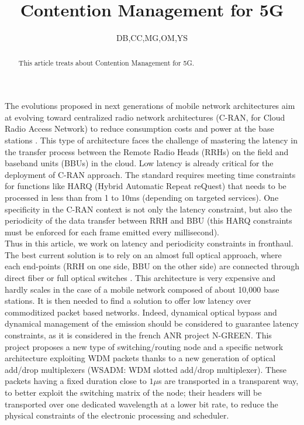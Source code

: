 \documentclass[a4paper,10pt]{article}
\title{Contention Management for 5G}
\author{DB,CC,MG,OM,YS}
\begin{document}
\maketitle
\begin{abstract}
This article treats about Contention Management for 5G.
\end{abstract}
The evolutions proposed in next generations of mobile network architectures aim at evolving toward centralized radio network architectures (C-RAN, for Cloud Radio Access Network) to reduce consumption costs and power at the base stations \cite{mobile2011c}. This type of architecture faces the challenge of mastering the latency in the transfer process between the Remote Radio Heads (RRHs) on the field and baseband units (BBUs) in the cloud. Low latency is already critical for the deployment of C-RAN approach. The standard requires meeting time constraints for functions like HARQ (Hybrid Automatic Repeat reQuest) that needs to be processed in less than from 1 to 10ms \cite{bouguen2012lte}
(depending on targeted services). One specificity in the C-RAN context is not only the latency constraint, but also the periodicity of the data transfer between RRH and BBU (this HARQ constraints must be enforced for each frame emitted every millisecond).\\
 Thus in this article, we work on latency and periodicity constraints in fronthaul.  The best current solution is to rely on an almost full optical approach, where each end-points (RRH on one side, BBU on the other side) are connected through direct fiber or full optical switches \cite{5gppparchitecture}. This architecture is very expensive and hardly scales in the case of a mobile network composed of about 10,000 base stations.  It is then needed to find a solution to offer low latency over commoditized packet based networks. Indeed,  dynamical optical bypass and dynamical management of the emission should be considered to guarantee latency constraints, as it is considered in the french ANR project N-GREEN. This project proposes a new type of switching/routing node and a specific network architecture exploiting WDM packets thanks to a new generation of optical add/drop multiplexers (WSADM: WDM slotted add/drop multiplexer). These packets having a fixed duration close to $1\mu $s are transported in a transparent way, to better exploit the switching matrix of the node; their headers will be transported over one dedicated wavelength at a lower bit rate, to reduce the physical constraints of the electronic processing and scheduler.\\
\end{document}
